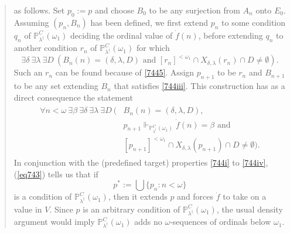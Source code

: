 \documentclass[12pt, twoside]{memoir}
\numberwithin{equation}{section}
\theoremstyle{definition}
\theoremstyle{remark}
\theoremstyle{definition}
\theoremstyle{definition}
\theoremstyle{definition}
\theoremstyle{remark}
\begin{document}
\begin{quote}
\begin{enumerate}[label=(\roman*)]
\end{enumerate}
as follows. Set $p_0 := p$ and choose $B_0$ to be any surjection from $A_n$ onto $E_0$. Assuming $(p_n, B_n)$ has been defined, we first extend $p_n$ to some condition $q_n$ of $\mathbb{P}^C_{\lambda^{\dagger}}(\omega_1)$ deciding the ordinal value of $\dot{f}(n)$, before extending $q_n$ to another condition $r_n$ of $\mathbb{P}^C_{\lambda^{\dagger}}(\omega_1)$ for which 
\begin{equation*}
    \exists \delta \ \exists \lambda \ \exists D \ (B_n(n) = (\delta, \lambda, D) \text{ and } [r_n]^{< \omega_1} \cap X_{\delta, \lambda}(r_n) \cap D \neq \emptyset) \text{.}
\end{equation*}
Such an $r_n$ can be found because of \ref{7445}. Assign $p_{n+1}$ to be $r_n$ and $B_{n+1}$ to be any set extending $B_n$ that satisfies \ref{744iii}. This construction has as a direct consequence the statement
\begin{align}\label{eq743}
\begin{split}
    \forall n < \omega \ \exists \beta \ \exists \delta \ \exists \lambda \ \exists D \ (& B_n(n) = (\delta, \lambda, D) \text{,} \\
    & p_{n+1} \Vdash_{\mathbb{P}^C_{\lambda^{\dagger}}(\omega_1)} \dot{f}(n) = \beta \text{ and} \\
    & [p_{n+1}]^{< \omega_1} \cap X_{\delta, \lambda}(p_{n+1}) \cap D \neq \emptyset) \text{.}
\end{split}
\end{align}
In conjunction with the (predefined target) properties \ref{744i} to \ref{744iv}, (\ref{eq743}) tells us that if
\begin{equation*}
    p^* := \bigcup \{p_n : n < \omega\}
\end{equation*}
is a condition of $\mathbb{P}^C_{\lambda^{\dagger}}(\omega_1)$, then it extends $p$ and forces $\dot{f}$ to take on a value in $V$. Since $p$ is an arbitrary condition of $\mathbb{P}^C_{\lambda^{\dagger}}(\omega_1)$, the usual density argument would imply $\mathbb{P}^C_{\lambda^{\dagger}}(\omega_1)$ adds no $\omega$-sequences of ordinals below $\omega_1$.
\end{quote}
\end{document}
